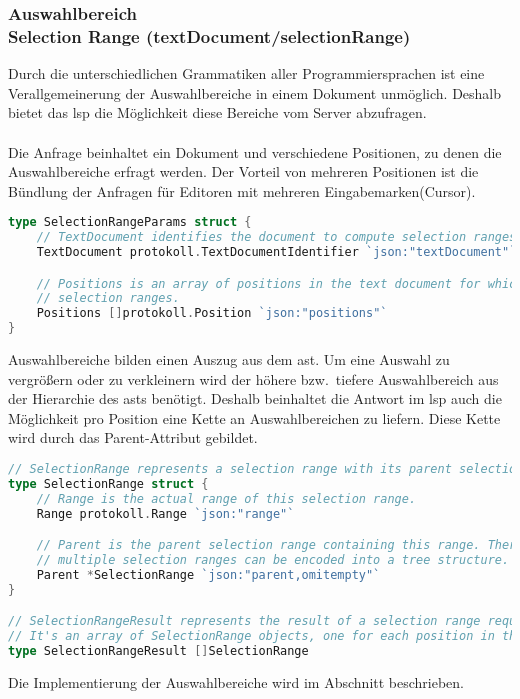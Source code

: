 \documentclass[./einleitung.tex]{subfiles}
\begin{document}
    \subsubsection[Auswahlbereich]{Auswahlbereich\\ {\textnormal{\footnotesize Selection Range (textDocument/selectionRange) \cite{selection}}}}\label{subsubsec:selection}
    Durch die unterschiedlichen Grammatiken aller Programmiersprachen ist eine Verallgemeinerung der Auswahlbereiche in einem Dokument unmöglich.
    Deshalb bietet das \acrshort{lsp} die Möglichkeit diese Bereiche vom Server abzufragen.
    \\\\
    Die Anfrage beinhaltet ein Dokument und verschiedene Positionen, zu denen die Auswahlbereiche erfragt werden.
    Der Vorteil von mehreren Positionen ist die Bündlung der Anfragen für Editoren mit mehreren Eingabemarken(Cursor).
    \begin{lstlisting}[language=Go, title=Auszug aus den Parametern, label=lst:selectionParams]
type SelectionRangeParams struct {
	// TextDocument identifies the document to compute selection ranges for.
	TextDocument protokoll.TextDocumentIdentifier `json:"textDocument"`

	// Positions is an array of positions in the text document for which to compute
	// selection ranges.
	Positions []protokoll.Position `json:"positions"`
}
    \end{lstlisting}
    Auswahlbereiche bilden einen Auszug aus dem \acrshort{ast}.
    Um eine Auswahl zu vergrößern oder zu verkleinern wird der höhere bzw.\ tiefere Auswahlbereich aus der Hierarchie des \acrshort{ast}s benötigt.
    Deshalb beinhaltet die Antwort im \acrshort{lsp} auch die Möglichkeit pro Position eine Kette an Auswahlbereichen zu liefern.
    Diese Kette wird durch das Parent-Attribut gebildet.
    \begin{lstlisting}[language=Go, title=Antwort des Servers, label=lst:selectionResult]
// SelectionRange represents a selection range with its parent selection ranges.
type SelectionRange struct {
	// Range is the actual range of this selection range.
	Range protokoll.Range `json:"range"`

	// Parent is the parent selection range containing this range. Therefore,
	// multiple selection ranges can be encoded into a tree structure.
	Parent *SelectionRange `json:"parent,omitempty"`
}

// SelectionRangeResult represents the result of a selection range request.
// It's an array of SelectionRange objects, one for each position in the request.
type SelectionRangeResult []SelectionRange
    \end{lstlisting}
    Die Implementierung der Auswahlbereiche wird im Abschnitt  beschrieben.
\end{document}

